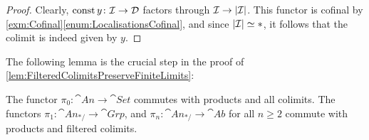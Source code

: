 \begin{proof}
	Clearly, $\operatorname{const} y\colon \mathcal{I}\rightarrow \mathcal{D}$ factors through $\mathcal{I}\rightarrow\left|\mathcal{I}\right|$. This functor is cofinal by \cref{exm:Cofinal}\cref{enum:LocalisationsCofinal}, and since $ \left|\mathcal{I}\right|\simeq *$, it follows that the colimit is indeed given by $y$. 
\end{proof}
The following lemma is the crucial step in the proof of \cref{lem:FilteredColimitsPreserveFiniteLimits}:
\begin{lem}\label{lem:HomotopyGroupsFilteredColimits}
	The functor $\pi_0\colon \cat{An}\rightarrow \cat{Set}$ commutes with products and all colimits. The functors $\pi_1\colon \cat{An}_{*/}\rightarrow\cat{Grp}$, and $\pi_n\colon\cat{An}_{*/}\rightarrow\cat{Ab}$ for all $n\geqslant 2$ commute with products and filtered colimits.
\end{lem}
